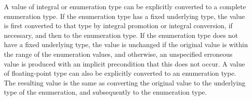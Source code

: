 \pnum
{}%
%
A value of integral or enumeration type can be explicitly converted to
a complete enumeration type.
If the enumeration type has a fixed underlying type,
the value is first converted to that type
by
integral promotion or integral conversion,
if necessary, and
then to the enumeration type.
If the enumeration type does not have a fixed underlying type,
the value is unchanged
if the original value is within the range
of the enumeration values, and
otherwise, an unspecified erroneous value is produced with
an implicit precondition that this does not occur.
%
%
%
%
%
A value of floating-point type can also be explicitly converted to an enumeration type.
The resulting value is the same as converting the original value to the
underlying type of the enumeration, and subsequently to
the enumeration type.

